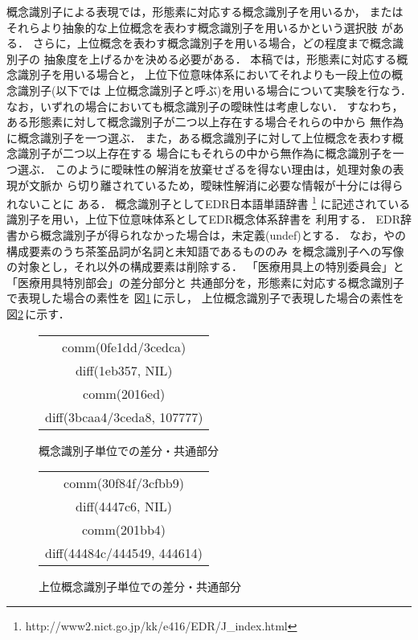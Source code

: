 概念識別子による表現では，形態素に対応する概念識別子を用いるか，
またはそれらより抽象的な上位概念を表わす概念識別子を用いるかという選択肢
がある．
さらに，上位概念を表わす概念識別子を用いる場合，どの程度まで概念識別子の
抽象度を上げるかを決める必要がある．
本稿では，形態素に対応する概念識別子を用いる場合と，
上位下位意味体系においてそれよりも一段上位の概念識別子(以下では
上位概念識別子と呼ぶ)を用いる場合について実験を行なう．
なお，いずれの場合においても概念識別子の曖昧性は考慮しない．
すなわち，ある形態素に対して概念識別子が二つ以上存在する場合それらの中から
無作為に概念識別子を一つ選ぶ．
また，ある概念識別子に対して上位概念を表わす概念識別子が二つ以上存在する
場合にもそれらの中から無作為に概念識別子を一つ選ぶ．
このように曖昧性の解消を放棄せざるを得ない理由は，処理対象の表現が文脈か
ら切り離されているため，曖昧性解消に必要な情報が十分には得られないことに
ある．
概念識別子としてEDR日本語単語辞書
\footnote{http://www2.nict.go.jp/kk/e416/EDR/J\_index.html}
に記述されている識別子を用い，上位下位意味体系としてEDR概念体系辞書を
利用する．
EDR辞書から概念識別子が得られなかった場合は，未定義(undef)とする．
なお，{\CT}や{\NT}の構成要素のうち茶筌品詞が名詞と未知語であるもののみ
を概念識別子への写像の対象とし，それ以外の構成要素は削除する．
{\CT}「医療用具上の特別委員会」と{\NT}「医療用具特別部会」の差分部分と
共通部分を，形態素に対応する概念識別子で表現した場合の素性を
図\ref{fig:mdiff_sem}\,に示し，
上位概念識別子で表現した場合の素性を図\ref{fig:mdiff_upsem}\,に示す．
\begin{figure}[htbp]
\begin{center}
\begin{tabular}{|c|}\hline
comm(0fe1dd/3cedca) \\
diff(1eb357, NIL) \\
comm(2016ed) \\
diff(3bcaa4/3ceda8, 107777) \\\hline
\end{tabular}
\end{center}
\caption{概念識別子単位での差分・共通部分}
\label{fig:mdiff_sem}
\end{figure}
\begin{figure}[htbp]
\begin{center}
\begin{tabular}{|c|}\hline
comm(30f84f/3cfbb9) \\
diff(4447c6, NIL) \\
comm(201bb4) \\
diff(44484c/444549, 444614) \\\hline
\end{tabular}
\end{center}
\caption{上位概念識別子単位での差分・共通部分}
\label{fig:mdiff_upsem}
\end{figure}


